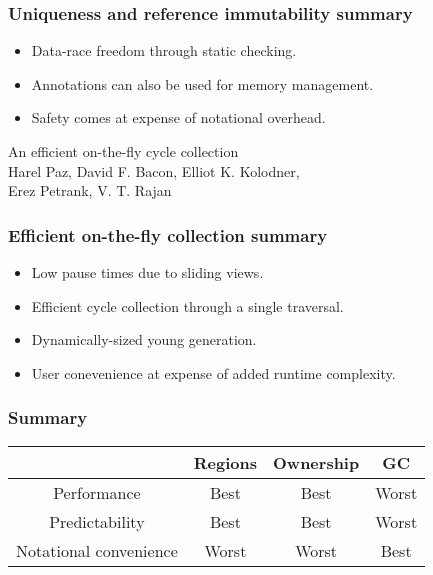 \begin{frame}
    \frametitle{Uniqueness and reference immutability summary}
    \begin{itemize}
        \item Data-race freedom through static checking.
        \item Annotations can also be used for memory management.
        \item Safety comes at expense of notational overhead.
    \end{itemize}
\end{frame}

\begin{frame}
    \begin{center}
        {\LARGE An efficient on-the-fly cycle collection} \\
        \vspace{20pt}
        Harel Paz, David F. Bacon, Elliot K. Kolodner,\\
        Erez Petrank, V. T. Rajan
    \end{center}
\end{frame}

\begin{frame}
    \frametitle{Efficient on-the-fly collection summary}
    \begin{itemize}
        \item Low pause times due to sliding views.
        \item Efficient cycle collection through a single traversal.
        \item Dynamically-sized young generation.
        \item User conevenience at expense of added runtime complexity.
    \end{itemize}
\end{frame}

\begin{frame}
    \frametitle{Summary}
    \Large
    \newcommand{\Best}{{\color{seagreen} Best}}
    \newcommand{\Worst}{{\color{alizarin} Worst}}
    \begin{center}
        \begin{tabular}{c | c | c | c}
                                   & Regions & Ownership & GC     \\
                                   \hline
            Performance            & \Best   & \Best     & \Worst \\
            Predictability         & \Best   & \Best     & \Worst \\
            Notational convenience & \Worst  & \Worst    & \Best

        \end{tabular}
    \end{center}
\end{frame}

